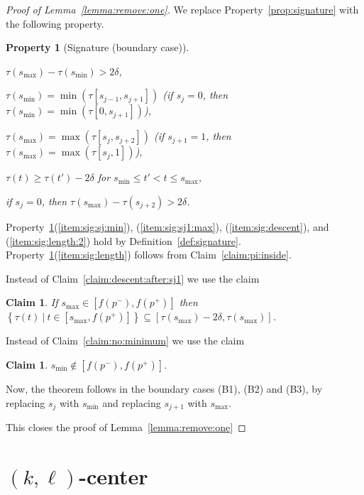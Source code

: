 \documentclass[11pt, letter]{article}
\newtheorem{claim}[theorem]{Claim}
\newtheorem{property}[]{Property}
\newcommand{\lemref}[1]{Lemma~\ref{lemma:#1}}
\newcommand{\defref}[1]{Definition~\ref{def:#1}}
\newcommand{\claimref}[1]{Claim~\ref{claim:#1}}
\newcommand{\proplab}[1]{\label{prop:#1}}
\newcommand{\propref}[1]{Property~\ref{prop:#1}}
\providecommand{\brc}[1]{\left\{ {#1} \right\}}
\newcommand{\nrClusters}{\ensuremath{k}}
\newcommand{\lenClusters}{\ensuremath{\ell}}
\newcommand{\setSubC}[4]{\ensuremath{\brc{ #1(#2) ~|~ #2 \in [#3,#4]} }}
\newcommand{\minSubC}[4]{\ensuremath{\min( #1[#3,#4])}}
\newcommand{\maxSubC}[4]{\ensuremath{\max( #1[#3,#4])}}
\begin{document}
\begin{proof}[Proof of \lemref{remove:one}]
We replace \propref{signature} with the following property. 
\begin{property}[Signature (boundary case)]
\mbox{}
\begin{compactenum}[(i)]
\item $\tau(s_{\max}) - \tau(s_{\min}) > 2\delta$,
\item $\tau(s_{\min}) = \minSubC{\tau}{t}{s_{j-1}}{s_{j+1}}$ 
      (if $s_j=0$, then $\tau(s_{\min}) = \minSubC{\tau}{t}{0}{s_{j+1}}$),
\item $\tau(s_{\max}) = \maxSubC{\tau}{t}{s_j}{s_{j+2}}$ 
      (if $s_{j+1}=1$, then $\tau(s_{\max}) = \maxSubC{\tau}{t}{s_j}{1}$),
\item $\tau(t) \geq \tau(t')-2\delta$ for $s_{\min}\leq t' < t \leq
s_{\max}$,
\item if $s_{j}=0$, then $\tau(s_{\max}) - \tau(s_{j+2}) > 2\delta$.
\end{compactenum}
\proplab{signature:boundary}
\end{property}

\propref{signature:boundary}(\ref{item:sig:sj:min}), (\ref{item:sig:sj1:max}), 
(\ref{item:sig:descent}), and (\ref{item:sig:length:2}) hold by \defref{signature}.
\propref{signature:boundary}(\ref{item:sig:length}) follows from
\claimref{pi:inside}.

Instead of \claimref{descent:after:sj1} we use the claim
\begin{claim}
If $s_{\max} \in [f(p^{-}),f(p^{+})]$ then
$\setSubC{\tau}{t}{s_{\max}}{f(p^{+})} \subseteq [\tau(s_{\max})-2\delta, \tau(s_{\max})]$.
\end{claim}

Instead of \claimref{no:minimum} we use the claim
\begin{claim}
$s_{\min} \notin [f(p^{-}),f(p^{+})]$.
\end{claim}

Now, the theorem follows in the boundary cases (B1), (B2) and (B3), by replacing
$s_j$ with $s_{\min}$ and replacing $s_{j+1}$ with $s_{\max}$.




This closes the proof of \lemref{remove:one}
\end{proof}




\section{$(\nrClusters,\lenClusters)$-center}
\end{document}
